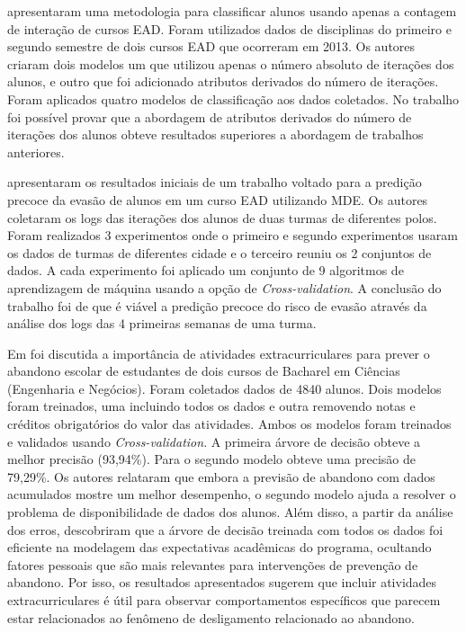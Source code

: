 \documentclass[diss,capa]{texufpel}
\begin{document}
\citealp{detoni2015modelagem} apresentaram uma metodologia para classificar alunos usando apenas a contagem de interação de cursos EAD.
Foram utilizados dados de disciplinas do primeiro e segundo semestre de dois cursos EAD que ocorreram em 2013.
Os autores criaram dois modelos um que utilizou apenas o número absoluto de iterações dos alunos, e outro que foi adicionado atributos derivados do número de iterações.
Foram aplicados quatro modelos de classificação aos dados coletados.
No trabalho foi possível provar que a abordagem de atributos derivados do número de iterações dos alunos obteve resultados superiores a abordagem de trabalhos anteriores.

\citealp{queiroga2015estudo} apresentaram os resultados iniciais de um trabalho voltado para a predição precoce da evasão de alunos em um curso EAD utilizando MDE.
Os autores coletaram os logs das iterações dos alunos de duas turmas de diferentes polos.
Foram realizados 3 experimentos onde o primeiro e segundo experimentos usaram os dados de turmas de diferentes cidade e o terceiro reuniu os 2 conjuntos de dados.
A cada experimento foi aplicado um conjunto de 9 algoritmos de aprendizagem de máquina usando a opção de \textit{Cross-validation}.
A conclusão do trabalho foi de que é viável a predição precoce do risco de evasão através da análise dos logs das 4 primeiras semanas de uma turma.

Em \citealp{hasbun2016extracurricular} foi discutida a importância de atividades extracurriculares para prever o abandono escolar de estudantes de dois cursos de Bacharel em Ciências (Engenharia e Negócios).
Foram coletados dados de 4840 alunos.
Dois modelos foram treinados, uma incluindo todos os dados e outra removendo notas e créditos obrigatórios do valor das atividades.
Ambos os modelos foram treinados e validados usando \textit{Cross-validation}.
A primeira árvore de decisão obteve a melhor precisão (93,94\%).
Para o segundo modelo obteve uma precisão de 79,29\%.
Os autores relataram que embora a previsão de abandono com dados acumulados mostre um melhor desempenho, o segundo modelo ajuda a resolver o problema de disponibilidade de dados dos alunos.
Além disso, a partir da análise dos erros, descobriram que a árvore de decisão treinada com todos os dados foi eficiente na modelagem das expectativas acadêmicas do programa, ocultando fatores pessoais que são mais relevantes para intervenções de prevenção de abandono.
Por isso, os resultados apresentados sugerem que incluir atividades extracurriculares é útil para observar comportamentos específicos que parecem estar relacionados ao fenômeno de desligamento relacionado ao abandono.
\end{document}
